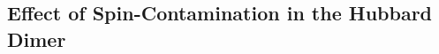 \documentclass[aps,prb,reprint,noshowkeys,linenumbers,superscriptaddress]{revtex4-1}
\newcommand{\titou}[1]{\textcolor{red}{#1}}
\newcommand{\latin}[1]{#1}
\newcommand{\ie}{\latin{i.e.}}
\begin{document}


\subsection{Effect of Spin-Contamination in the Hubbard Dimer}
\end{document}
